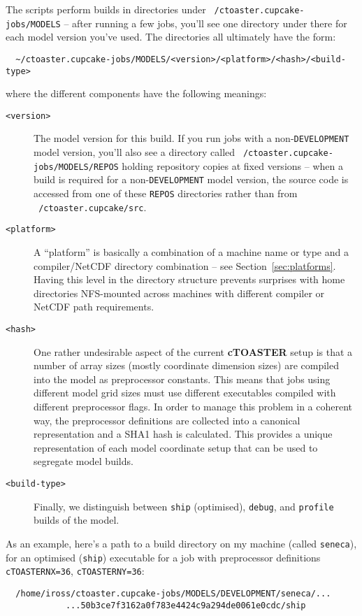 \documentclass[a4paper,10pt,article]{memoir}
\begin{document}
The scripts perform builds in directories under
\texttt{~/ctoaster.cupcake-jobs/MODELS} -- after running a few jobs, you'll see
one directory under there for each model version you've used.  The
directories all ultimately have the form:
\begin{verbatim}
  ~/ctoaster.cupcake-jobs/MODELS/<version>/<platform>/<hash>/<build-type>
\end{verbatim}
where the different components have the following meanings:
\begin{description}
  \item[\texttt{<version>}]{The model version for this build.  If you
    run jobs with a non-\texttt{DEVELOPMENT} model version, you'll
    also see a directory called \texttt{~/ctoaster.cupcake-jobs/MODELS/REPOS}
    holding repository copies at fixed versions -- when a build is
    required for a non-\texttt{DEVELOPMENT} model version, the source
    code is accessed from one of these \texttt{REPOS} directories
    rather than from \texttt{~/ctoaster.cupcake/src}.}
  \item[\texttt{<platform>}]{A ``platform'' is basically a combination
    of a machine name or type and a compiler/NetCDF directory
    combination -- see Section~\ref{sec:platforms}.  Having this level
    in the directory structure prevents surprises with home
    directories NFS-mounted across machines with different compiler or
    NetCDF path requirements.}
  \item[\texttt{<hash>}]{One rather undesirable aspect of the current
    \textbf{cTOASTER} setup is that a number of array sizes (mostly coordinate
    dimension sizes) are compiled into the model as preprocessor
    constants.  This means that jobs using different model grid sizes
    must use different executables compiled with different
    preprocessor flags.  In order to manage this problem in a coherent
    way, the preprocessor definitions are collected into a canonical
    representation and a SHA1 hash is calculated.  This provides a
    unique representation of each model coordinate setup that can be
    used to segregate model builds.}
  \item[\texttt{<build-type>}]{Finally, we distinguish between
    \texttt{ship} (optimised), \texttt{debug}, and \texttt{profile}
    builds of the model.}
\end{description}
As an example, here's a path to a build directory on my machine
(called \texttt{seneca}), for an optimised (\texttt{ship}) executable
for a job with preprocessor definitions \texttt{cTOASTERNX=36},
\texttt{cTOASTERNY=36}:
\begin{verbatim}
  /home/iross/ctoaster.cupcake-jobs/MODELS/DEVELOPMENT/seneca/...
            ...50b3ce7f3162a0f783e4424c9a294de0061e0cdc/ship
\end{verbatim}
\end{document}
